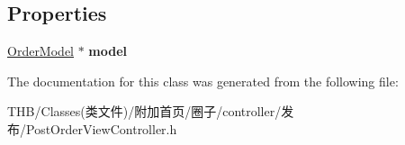 \subsection*{Properties}
\begin{DoxyCompactItemize}
\item 
\mbox{\label{interface_post_order_view_controller_ae5ca0e76a2cae7aa5e4f584ca1cbd059}} 
\mbox{\hyperlink{interface_order_model}{Order\+Model}} $\ast$ {\bfseries model}
\end{DoxyCompactItemize}


The documentation for this class was generated from the following file\+:\begin{DoxyCompactItemize}
\item 
T\+H\+B/\+Classes(类文件)/附加首页/圈子/controller/发布/Post\+Order\+View\+Controller.\+h\end{DoxyCompactItemize}
